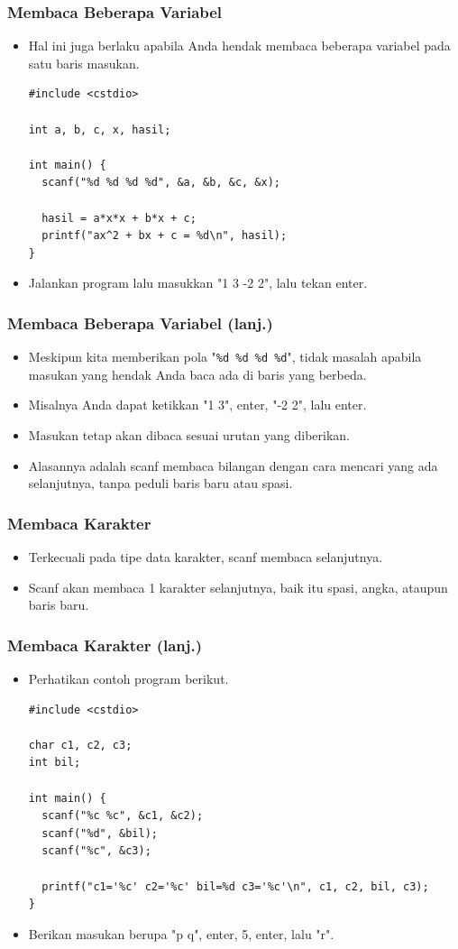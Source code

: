 \begin{frame}[fragile]
\frametitle{Membaca Beberapa Variabel}
  \begin{itemize}
    \item Hal ini juga berlaku apabila Anda hendak membaca beberapa variabel pada satu baris masukan.
\begin{lstlisting}
#include <cstdio>

int a, b, c, x, hasil;

int main() {
  scanf("%d %d %d %d", &a, &b, &c, &x);

  hasil = a*x*x + b*x + c;
  printf("ax^2 + bx + c = %d\n", hasil);
}
\end{lstlisting}    
    \item Jalankan program lalu masukkan "1 3 -2 2", lalu tekan enter.
  \end{itemize}
\end{frame}

\begin{frame}[fragile]
\frametitle{Membaca Beberapa Variabel (lanj.)}
  \begin{itemize}
    \item Meskipun kita memberikan pola "\texttt{\%d \%d \%d \%d}", tidak masalah apabila masukan yang hendak Anda baca ada di baris yang berbeda.
    \item Misalnya Anda dapat ketikkan "1 3", enter, "-2 2", lalu enter.
    \item Masukan tetap akan dibaca sesuai urutan yang diberikan.
    \item Alasannya adalah scanf membaca bilangan dengan cara mencari  yang ada selanjutnya, tanpa peduli baris baru atau spasi.
  \end{itemize}
\end{frame}

\begin{frame}[fragile]
\frametitle{Membaca Karakter}
  \begin{itemize}
    \item Terkecuali pada tipe data karakter, scanf  membaca  selanjutnya.
    \item Scanf akan membaca 1 karakter selanjutnya, baik itu spasi, angka, ataupun baris baru.
  \end{itemize}
\end{frame}

\begin{frame}[fragile]
\frametitle{Membaca Karakter (lanj.)}
  \begin{itemize}
    \item Perhatikan contoh program berikut.
\begin{lstlisting}
#include <cstdio>

char c1, c2, c3;
int bil;

int main() {
  scanf("%c %c", &c1, &c2);
  scanf("%d", &bil);
  scanf("%c", &c3);

  printf("c1='%c' c2='%c' bil=%d c3='%c'\n", c1, c2, bil, c3);
}
\end{lstlisting}    
    \item Berikan masukan berupa "p q", enter, 5, enter, lalu "r".
  \end{itemize}
\end{frame}

